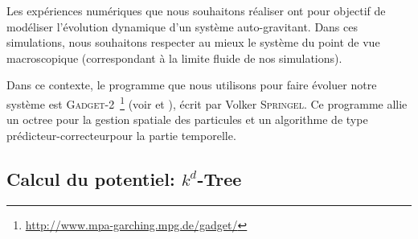 		Les expériences numériques que nous souhaitons réaliser ont pour objectif de modéliser l'évolution
		dynamique d'un système auto-gravitant. Dans ces simulations, nous souhaitons respecter au mieux le
		système du point de vue macroscopique (correspondant à la limite fluide de nos simulations).


		Dans ce contexte, le programme que nous utilisons pour faire évoluer notre système est
		\textsc{Gadget-2}~\footnote{\url{http://www.mpa-garching.mpg.de/gadget/}} (voir \cite{gadget2} et \cite{gadget1}),
		écrit par Volker \textsc{Springel}.
		Ce programme allie un octree pour la gestion spatiale des particules et un algorithme de type \og
		prédicteur-correcteur\fg pour la partie temporelle.



		\subsection{Calcul du potentiel: $k^d$-Tree}
			\label{Sec::KdTree}

